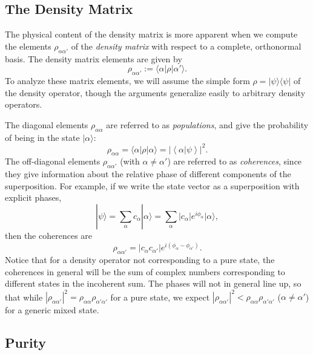 \documentclass[12pt,aps,onecolum,superscriptaddress,footinbib,floatfix,showpacs]{revtex4-1}
\def\ket#1{|{#1}\rangle}
\def\bra#1{\langle{#1}|}
\def\expct#1{\!\left\langle{#1}\right\rangle}
\begin{document}
\subsection{The Density Matrix}

The physical content of the density matrix is more apparent when 
we compute the elements $\rho_{\alpha\alpha'}$
of the \textit{density matrix} with respect to a complete, orthonormal basis.
The density matrix elements are given by
\begin{equation}
  \rho_{\alpha\alpha'} := \bra{\alpha}\rho\ket{\alpha'}.
\end{equation}
To analyze these matrix elements, we will assume the simple form
$\rho = \ket\psi\bra\psi$ of the density operator, though the
arguments generalize easily to arbitrary density operators.

The diagonal elements $\rho_{\alpha\alpha}$
are referred to as \textit{populations}, and give the probability
of being in the state $\ket\alpha$:
\begin{equation}
  \rho_{\alpha\alpha}=\bra{\alpha}\rho\ket{\alpha}
   = \left|\expct{\alpha|\psi}\right|^2.
\end{equation}
The off-diagonal elements $\rho_{\alpha\alpha'}$ (with $\alpha\neq\alpha'$)
are referred to as \textit{coherences}, since they give
information about the relative
phase of different components of the superposition.
For example, if we write the state vector as a superposition with
explicit phases,
\begin{equation}
  \ket\psi = \sum_\alpha c_\alpha \ket\alpha = \sum_\alpha |c_\alpha| e^{i\phi_\alpha}\ket\alpha,
\end{equation}
then the coherences are
\begin{equation}
  \rho_{\alpha\alpha'} = |c_\alpha c_{\alpha'}| e^{i(\phi_\alpha-\phi_{\alpha'})}.
\end{equation}
Notice that for a density operator not corresponding to a pure
state, the coherences in general will be the sum of complex numbers
corresponding to different states in the incoherent sum.
The phases will not in general line up, so that 
while $|\rho_{\alpha\alpha'}|^2 = \rho_{\alpha\alpha}\rho_{\alpha'\alpha'}$
for a pure state,
we expect $|\rho_{\alpha\alpha'}|^2 < \rho_{\alpha\alpha}\rho_{\alpha'\alpha'}$ 
($\alpha\neq\alpha'$) for a generic mixed
state.


\subsection{Purity}
\end{document}
